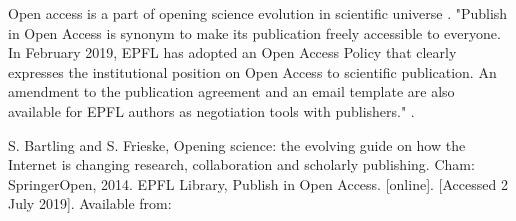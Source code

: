\documentclass[a4paper]{article}
\begin{document}

Open access is a part of opening science evolution in scientific universe \cite{Bartling2014}.
"Publish in Open Access is synonym to make its publication freely accessible to everyone. In February 2019, EPFL has adopted an Open Access Policy that clearly expresses the institutional position on Open Access to scientific
publication. An amendment to the publication agreement and an email template are also available for EPFL authors as negotiation tools with publishers." \cite{EPFLlibrary2019}.
 \begin{thebibliography}{10}
  S. Bartling and S. Frieske, Opening science: the evolving guide on how the Internet is changing research, collaboration and scholarly publishing. Cham: SpringerOpen, 2014.
  EPFL Library, Publish in Open Access. [online]. [Accessed 2 July 2019]. Available from:
  \end{thebibliography}
\end{document}
